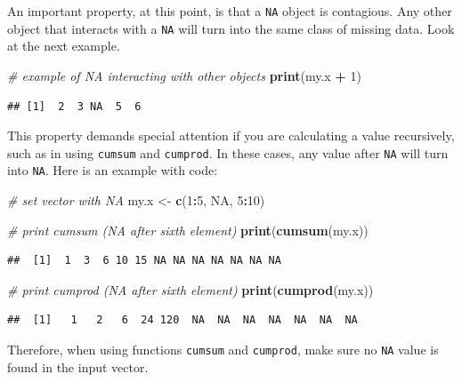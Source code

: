 \documentclass[11pt,]{book}
\newenvironment{Shaded}{\begin{snugshade}}{\end{snugshade}}
\newcommand{\KeywordTok}[1]{\textcolor[rgb]{0.27,0.27,0.27}{\textbf{#1}}}
\newcommand{\DecValTok}[1]{\textcolor[rgb]{0.06,0.06,0.06}{#1}}
\newcommand{\StringTok}[1]{\textcolor[rgb]{0.5,0.5,0.5}{#1}}
\newcommand{\CommentTok}[1]{\textcolor[rgb]{0.56,0.35,0.01}{\textit{#1}}}
\newcommand{\OtherTok}[1]{\textcolor[rgb]{0.56,0.35,0.01}{#1}}
\newcommand{\OperatorTok}[1]{\textcolor[rgb]{0.81,0.36,0.00}{\textbf{#1}}}
\newcommand{\NormalTok}[1]{#1}
\begin{document}
An important property, at this point, is that a \texttt{NA} object is
contagious. Any other object that interacts with a \texttt{NA} will turn
into the same class of missing data. Look at the next example.

\begin{Shaded}
\begin{Highlighting}[]
\CommentTok{# example of NA interacting with other objects}
\KeywordTok{print}\NormalTok{(my.x }\OperatorTok{+}\StringTok{ }\DecValTok{1}\NormalTok{)}
\end{Highlighting}
\end{Shaded}

\begin{verbatim}
## [1]  2  3 NA  5  6
\end{verbatim}

This property demands special attention if you are calculating a value
recursively, such as in using \texttt{cumsum} and \texttt{cumprod}. In
these cases, any value after \texttt{NA} will turn into \texttt{NA}.
Here is an example with code:

\begin{Shaded}
\begin{Highlighting}[]
\CommentTok{# set vector with NA}
\NormalTok{my.x <-}\StringTok{ }\KeywordTok{c}\NormalTok{(}\DecValTok{1}\OperatorTok{:}\DecValTok{5}\NormalTok{, }\OtherTok{NA}\NormalTok{, }\DecValTok{5}\OperatorTok{:}\DecValTok{10}\NormalTok{)}

\CommentTok{# print cumsum (NA after sixth element)}
\KeywordTok{print}\NormalTok{(}\KeywordTok{cumsum}\NormalTok{(my.x))}
\end{Highlighting}
\end{Shaded}

\begin{verbatim}
##  [1]  1  3  6 10 15 NA NA NA NA NA NA NA
\end{verbatim}

\begin{Shaded}
\begin{Highlighting}[]
\CommentTok{# print cumprod (NA after sixth element)}
\KeywordTok{print}\NormalTok{(}\KeywordTok{cumprod}\NormalTok{(my.x))}
\end{Highlighting}
\end{Shaded}

\begin{verbatim}
##  [1]   1   2   6  24 120  NA  NA  NA  NA  NA  NA  NA
\end{verbatim}

Therefore, when using functions \texttt{cumsum} and \texttt{cumprod},
make sure no \texttt{NA} value is found in the input vector.
\end{document}
